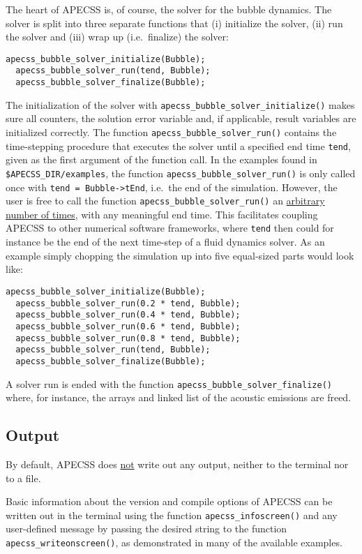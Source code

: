 The heart of APECSS is, of course, the solver for the bubble dynamics. The solver is split into three separate functions that (i) initialize the solver, (ii) run the solver and (iii) wrap up (i.e.~finalize) the solver:
\begin{lstlisting}[style=CStyle,numbers=none]
  apecss_bubble_solver_initialize(Bubble);
  apecss_bubble_solver_run(tend, Bubble);
  apecss_bubble_solver_finalize(Bubble);
\end{lstlisting}\vspace{-0.75em}
The initialization of the solver with {\tt apecss\_bubble\_solver\_initialize()} makes sure all counters, the solution error variable and, if applicable, result variables are initialized correctly. The function {\tt apecss\_bubble\_solver\_run()} contains the time-stepping procedure that executes the solver until a specified end time {\tt tend}, given as the first argument of the function call. In the examples found in {\tt \$APECSS\_DIR/examples}, the function {\tt apecss\_bubble\_solver\_run()} is only called once with {\tt tend = Bubble->tEnd}, i.e.~the end of the simulation. However, the user is free to call the function {\tt apecss\_bubble\_solver\_run()} an \uline{arbitrary number of times}, with any meaningful end time. This facilitates coupling APECSS to other numerical software frameworks, where {\tt tend} then could for instance be the end of the next time-step of a fluid dynamics solver. As an example simply chopping the simulation up into five equal-sized parts would look like:
\begin{lstlisting}[style=CStyle,numbers=none]
  apecss_bubble_solver_initialize(Bubble);
  apecss_bubble_solver_run(0.2 * tend, Bubble);
  apecss_bubble_solver_run(0.4 * tend, Bubble);
  apecss_bubble_solver_run(0.6 * tend, Bubble);
  apecss_bubble_solver_run(0.8 * tend, Bubble);
  apecss_bubble_solver_run(tend, Bubble);
  apecss_bubble_solver_finalize(Bubble);
\end{lstlisting}\vspace{-0.75em}
A solver run is ended with the function {\tt apecss\_bubble\_solver\_finalize()} where, for instance, the arrays and linked list of the acoustic emissions are freed.

\subsection{Output}
By default, APECSS does \uline{not} write out any output, neither to the terminal nor to a file. 

Basic information about the version and compile options of APECSS can be written out in the terminal using the function {\tt apecss\_infoscreen()} and any user-defined message by passing the desired string to the function {\tt apecss\_writeonscreen()}, as demonstrated in many of the available examples.

